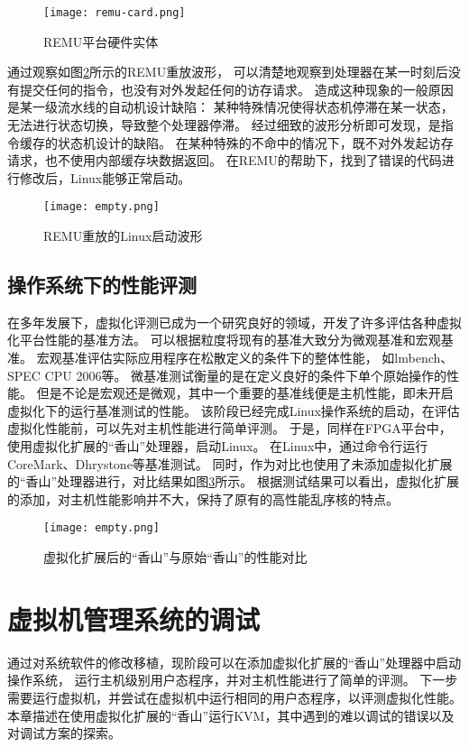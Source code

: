 \begin{figure}[htbp]
    \centering
    \texttt{[image: remu-card.png]}
    \caption{REMU平台硬件实体}
    \label{fig:remu-card}
\end{figure}

通过观察如图\ref{fig:console-block-wave}所示的REMU重放波形，
可以清楚地观察到处理器在某一时刻后没有提交任何的指令，也没有对外发起任何的访存请求。
造成这种现象的一般原因是某一级流水线的自动机设计缺陷：
某种特殊情况使得状态机停滞在某一状态，无法进行状态切换，导致整个处理器停滞。
经过细致的波形分析即可发现，是指令缓存的状态机设计的缺陷。
在某种特殊的不命中的情况下，既不对外发起访存请求，也不使用内部缓存块数据返回。
在REMU的帮助下，找到了错误的代码进行修改后，Linux能够正常启动。

\begin{figure}[htbp]
    \centering
    \texttt{[image: empty.png]}
    \caption{REMU重放的Linux启动波形}
    \label{fig:console-block-wave}
\end{figure}

\section{操作系统下的性能评测}
在多年发展下，虚拟化评测已成为一个研究良好的领域，开发了许多评估各种虚拟化平台性能的基准方法。
可以根据粒度将现有的基准大致分为微观基准和宏观基准。
宏观基准评估实际应用程序在松散定义的条件下的整体性能，
如lmbench、SPEC CPU 2006等。
微基准测试衡量的是在定义良好的条件下单个原始操作的性能。
但是不论是宏观还是微观，其中一个重要的基准线便是主机性能，即未开启虚拟化下的运行基准测试的性能。
该阶段已经完成Linux操作系统的启动，在评估虚拟化性能前，可以先对主机性能进行简单评测。
于是，同样在FPGA平台中，使用虚拟化扩展的“香山”处理器，启动Linux。
在Linux中，通过命令行运行CoreMark、Dhrystone等基准测试。
同时，作为对比也使用了未添加虚拟化扩展的“香山”处理器进行，对比结果如图\ref{fig:perf}所示。
根据测试结果可以看出，虚拟化扩展的添加，对主机性能影响并不大，保持了原有的高性能乱序核的特点。

\begin{figure}[htbp]
    \centering
    \texttt{[image: empty.png]}
    \caption{虚拟化扩展后的“香山”与原始“香山”的性能对比}
    \label{fig:perf}
\end{figure}

\chapter{虚拟机管理系统的调试}
通过对系统软件的修改移植，现阶段可以在添加虚拟化扩展的“香山”处理器中启动操作系统，
运行主机级别用户态程序，并对主机性能进行了简单的评测。
下一步需要运行虚拟机，并尝试在虚拟机中运行相同的用户态程序，以评测虚拟化性能。
本章描述在使用虚拟化扩展的“香山”运行KVM，其中遇到的难以调试的错误以及对调试方案的探索。

